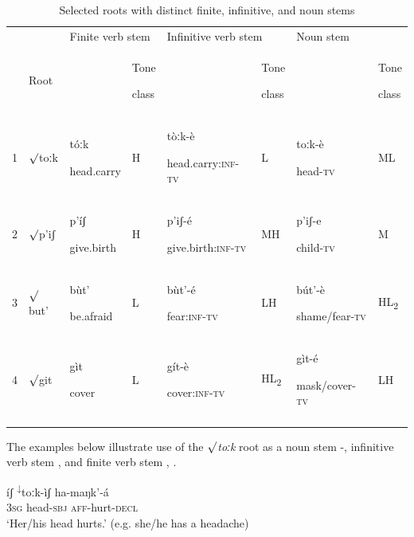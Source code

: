 \documentclass[output=paper]{langsci/langscibook}
\begin{document}
\begin{table}
\caption{Selected roots with distinct finite, infinitive, and noun stems}
\label{tab:3}
\begin{tabularx}{\textwidth}{XXXXXXXX} &  & \multicolumn{2}{X}{ Finite verb stem} & \multicolumn{2}{X}{ Infinitive verb stem} & \multicolumn{2}{X}{ Noun stem}\\
\lsptoprule
& Root &  & \multicolumn{1}{X}{Tone 

class} &  & \multicolumn{1}{X}{Tone 

class} &  & Tone 

class\\
1 & ${\surd}$toːk & t\'{o}ːk

head.carry & H & t\`{o}ːk-\`{e}

head.carry\textsc{:inf-tv} & L & toːk-\`{e}

head\textsc{{}-tv} & ML\\
2 & ${\surd}$p'iʃ & p'\'{i}ʃ

give.birth & H & p'iʃ-\'{e}

give.birth\textsc{:inf-tv} & MH & p'iʃ-e

child\textsc{{}-tv} & M\\
3 & ${\surd}$but' & b\`{u}t'

be.afraid & L & b\`{u}t'-\'{e}

fear\textsc{:inf-tv} & LH & b\'{u}t'-\`{e}

shame/fear\textsc{{}-tv} & HL\textsubscript{2}\\
4 & ${\surd}$git & g\`{i}t

cover & L & g\'{i}t-\`{e}

cover\textsc{:inf-tv} & HL\textsubscript{2} & g\`{i}t-\'{e}

mask/cover\textsc{{}-tv} & LH\\
\lspbottomrule
\end{tabularx}
\end{table}

The examples below illustrate use of the \textit{${\surd}$toːk} root as a noun stem -, infinitive verb stem , and finite verb stem , . 

\ea\label{ex:mahland:20}
\'{i}ʃ     \textsuperscript{↓}toːk-\`{i}ʃ       ha-maŋk'-\'{a}\\
\textsc{3sg}   head-\textsc{sbj}   \textsc{aff}{}-hurt-\textsc{decl} \\
\glt `Her/his head hurts.' (e.g. she/he has a headache)
\z
\end{document}
